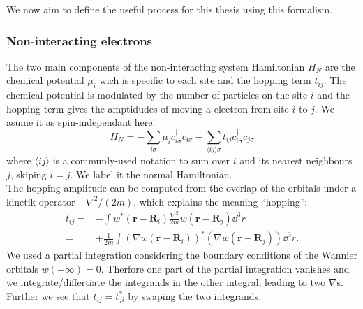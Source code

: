 \documentclass[../main.tex]{subfile}
\begin{document}
We now aim to define the useful process for this thesis using this formalism.

\subsubsection{Non-interacting electrons}
The two main components of the non-interacting system Hamiltonian $H_N$ are the chemical potential $\mu_i$ wich is specific to each site and the hopping term $t_{ij}$.
The chemical potential is modulated by the number of particles on the site $i$ and the hopping term gives the amptidudes of moving a electron from site $i$ to $j$.
We asume it as spin-independant here.\\
\begin{equation}\label{eq:Ham_Normal}
    H_N = - \sum_{i \sigma} \mu_i c_{i\sigma}^{\dagger} c_{i\sigma} - \sum_{\langle ij\rangle \sigma} t_{ij} c_{i\sigma}^{\dagger} c_{j\sigma}
\end{equation}
where $\langle ij\rangle$ is a communly-used notation to sum over $i$ and its nearest neighbours $j$, skiping $i=j$. We label it the normal
Hamiltonian.\\

The hopping amplitude can be computed from the overlap of the orbitals under a kinetik operator $-\nabla^2/(2m)$, which explains the meaning ``hopping'':
\begin{align*}
    t_{ij} =& -\int w^{\ast}(\bm{r} - \bm{R}_i) \frac{\nabla^2}{2m} w(\bm{r} - \bm{R}_j) \dd^3r\\
           =& +\frac{1}{2m}\int \left(\nabla w(\bm{r} - \bm{R}_i)\right)^{\ast} \left(\nabla w(\bm{r} - \bm{R}_j)\right) \dd^3r.
\end{align*}
We used a partial integration considering the boundary conditions of the Wannier orbitals $w(\pm \infty) = 0$. Therfore one part of the partial integration vanishes
and we integrate/differtiate the integrands in the other integral, leading to two $\nabla$s. Further we see that $t_{ij} = t_{ji}^{\ast}$ by swaping the two integrands.\\
\end{document}
